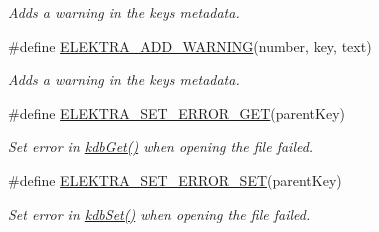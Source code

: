 \begin{DoxyCompactItemize}
\begin{DoxyCompactList}\small\item\em Adds a warning in the keys metadata. \end{DoxyCompactList}\item 
\#define \hyperlink{group__plugin_ga3da3bdb0f41710adda9eee3d7adac9ff}{E\+L\+E\+K\+T\+R\+A\+\_\+\+A\+D\+D\+\_\+\+W\+A\+R\+N\+I\+NG}(number,  key,  text)
\begin{DoxyCompactList}\small\item\em Adds a warning in the keys metadata. \end{DoxyCompactList}\item 
\#define \hyperlink{group__plugin_ga2f5d331ed725c6af0c511a0aa8677daa}{E\+L\+E\+K\+T\+R\+A\+\_\+\+S\+E\+T\+\_\+\+E\+R\+R\+O\+R\+\_\+\+G\+ET}(parent\+Key)
\begin{DoxyCompactList}\small\item\em Set error in \hyperlink{group__kdb_ga28e385fd9cb7ccfe0b2f1ed2f62453a1}{kdb\+Get()} when opening the file failed. \end{DoxyCompactList}\item 
\#define \hyperlink{group__plugin_gaf526686f01dbacd68671732aad4b5d76}{E\+L\+E\+K\+T\+R\+A\+\_\+\+S\+E\+T\+\_\+\+E\+R\+R\+O\+R\+\_\+\+S\+ET}(parent\+Key)
\begin{DoxyCompactList}\small\item\em Set error in \hyperlink{group__kdb_ga11436b058408f83d303ca5e996832bcf}{kdb\+Set()} when opening the file failed. \end{DoxyCompactList}\end{DoxyCompactItemize}
